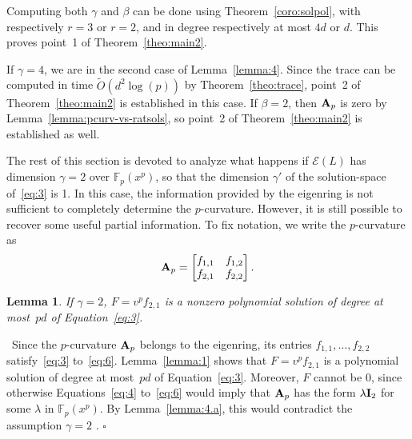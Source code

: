 \documentclass{sig-alternate}
\newcommand{\bigOsoft}{\tilde{O}}
\def\F {\mathbb{F}}
\def\mA {\ensuremath{{\bf A}}}
\def\mI {\ensuremath{{\bf I}}}
\def\myproof{\noindent{\sc Proof.}~}
\def\foorp{\hfill$\square$}
\newtheorem{Lemma}{Lemma}
\begin{document}
Computing both $\gamma$ and $\beta$ can be done using
Theorem~\ref{coro:solpol}, with respectively $r=3$ or $r=2$, and in
degree respectively at most $4d$ or $d$. This proves point~1 of
Theorem~\ref{theo:main2}.

If $\gamma=4$, we are in the second case of Lemma~\ref{lemma:4}. Since
the trace can be computed in time $\bigOsoft(d^2\log(p))$ by
Theorem~\ref{theo:trace}, point~2 of Theorem~\ref{theo:main2} is
established in this case. If $\beta=2$, then $\mA_p$ is zero by
Lemma~\ref{lemma:pcurv-vs-ratsols}, so point~2 of
Theorem~\ref{theo:main2} is established as well.

\smallskip{}  The rest of
this section is devoted to analyze what happens if $\mathcal{E}(L)$
has dimension $\gamma=2$ over $\F_p(x^p)$, so that the dimension
$\gamma'$ of the solution-space of~\eqref{eq:3} is 1. In this case,
the information provided by the eigenring is not sufficient to
completely determine the $p$-curvature. However, it is still possible
to recover some useful partial information. To fix notation,
we write the $p$-curvature as 
$$\mA_p = \left [ \begin{matrix}
  f_{1,1} & f_{1,2}\\
  f_{2,1} & f_{2,2}
\end{matrix} \right ].$$


\begin{Lemma}\label{lemma:dim1}
  If $\gamma=2$, $F=v^p f_{2,1}$ is a nonzero polynomial solution of
  degree at most~$pd$ of Equation~\eqref{eq:3}.
\end{Lemma}
\myproof Since the $p$-curvature $\mA_p$ belongs to the eigenring, its
entries $f_{1,1},\dots,f_{2,2}$ satisfy~\eqref{eq:3}
to~\eqref{eq:6}. Lemma~\ref{lemma:1} shows that $F=v^p f_{2,1}$ is a
polynomial solution of degree at most~$pd$ of Equation~\eqref{eq:3}.
Moreover, $F$ cannot be $0$, since otherwise Equations~\eqref{eq:4}
to~\eqref{eq:6} would imply that $\mA_p$ has the form $\lambda \mI_2$
for some $\lambda$ in $\F_p(x^p)$. By Lemma~\ref{lemma:4.a}, this
would contradict the assumption $\gamma=2$ .  \foorp
\end{document}
